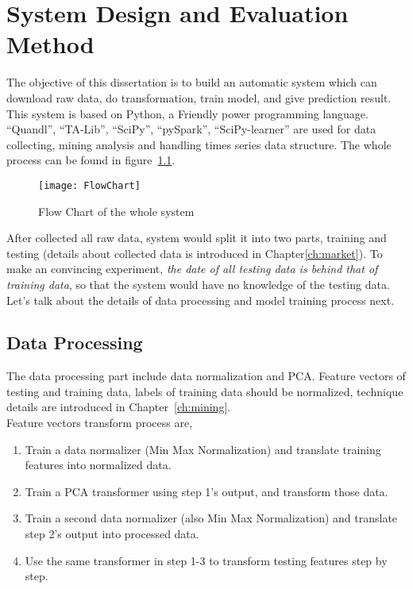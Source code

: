 \chapter{System Design and Evaluation Method}
\label{ch:system}

The objective of this dissertation is to build an automatic system which can download raw data, do transformation, train model, and give prediction result. This system is based on Python, a Friendly power programming language. “Quandl”, “TA-Lib”, “SciPy”, “pySpark”, “SciPy-learner” are used for data collecting, mining analysis and handling times series data structure. The whole process can be found in figure~\ref{fg:system_model}.
\begin{figure}[h]
	\centering
	\texttt{[image: FlowChart]}
	\caption{Flow Chart of the whole system}
	\label{fg:system_model}
\end{figure}

After collected all raw data, system would split it into two parts, training and testing (details about collected data is introduced in Chapter\ref{ch:market}). To make an convincing experiment, \emph{the date of all testing data is behind that of training data}, so that the system would have no knowledge of the testing data. Let's talk about the details of data processing and model training process next.\\


\section{Data Processing}
The data processing part include data normalization and PCA. Feature vectors of testing and training data, labels of training data should be normalized, technique details are introduced in Chapter~\ref{ch:mining}.\\


Feature vectors transform process are,
\begin{enumerate}
	\item Train a data normalizer (Min Max Normalization) and translate training features into normalized data.
	\item Train a PCA transformer using step 1's output, and transform those data.
	\item Train a second data normalizer (also Min Max Normalization) and translate step 2's output into processed data.
	\item Use the same transformer in step 1-3 to transform testing features step by step.
\end{enumerate}

